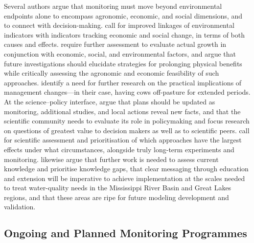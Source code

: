 Several authors argue that monitoring must move beyond environmental endpoints alone to encompass agronomic, economic, and social dimensions, and to connect with decision-making. \textcite{Zhang2018} call for improved linkages of environmental indicators with indicators tracking economic and social change, in terms of both causes and effects. \textcite{Zhu2025} require further assessment to evaluate actual growth in conjunction with economic, social, and environmental factors, and \textcite{Brikmans2025} argue that future investigations should elucidate strategies for prolonging physical benefits while critically assessing the agronomic and economic feasibility of such approaches. \textcite{Monaghan2016} identify a need for further research on the practical implications of management changes---in their case, having cows off-pasture for extended periods. At the science--policy interface, \textcite{Letey1999} argue that plans should be updated as monitoring, additional studies, and local actions reveal new facts, and that the scientific community needs to evaluate its role in policymaking and focus research on questions of greatest value to decision makers as well as to scientific peers. \textcite{Clifford2023} call for scientific assessment and prioritisation of which approaches have the largest effects under what circumstances, alongside truly long-term experiments and monitoring. \textcite{Kalcic2018} likewise argue that further work is needed to assess current knowledge and prioritise knowledge gaps, that clear messaging through education and extension will be imperative to achieve implementation at the scales needed to treat water-quality needs in the Mississippi River Basin and Great Lakes regions, and that these areas are ripe for future modeling development and validation.

\subsection{Ongoing and Planned Monitoring Programmes}

